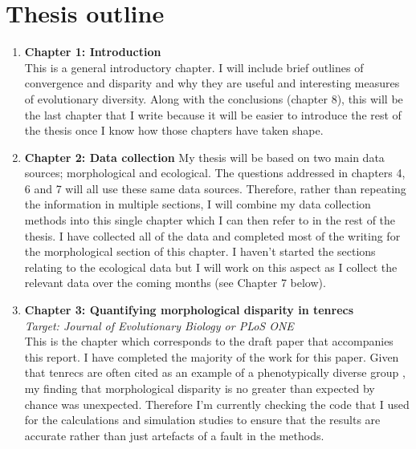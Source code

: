 \documentclass[12pt,a4paper]{article}
\begin{document}
\section{Thesis outline}
\begin{enumerate}
\item \textbf{Chapter 1: Introduction}\\

This is a general introductory chapter. I will include brief outlines of convergence and disparity and why they are useful and interesting measures of evolutionary diversity.
Along with the conclusions (chapter 8), this will be the last chapter that I write because it will be easier to introduce the rest of the thesis once I know how those chapters have taken shape. 

\item \textbf{Chapter 2: Data collection}
My thesis will be based on two main data sources; morphological and ecological. The questions addressed in chapters 4, 6 and 7 will all use these same data sources. Therefore, rather than repeating the information in multiple sections, I will combine my data collection methods into this single chapter which I can then refer to in the rest of the thesis. 
I have collected all of the data and completed most of the writing for the morphological section of this chapter. I haven't started the sections relating to the ecological data but I will work on this aspect as I collect the relevant data over the coming months (see Chapter 7 below).




\item \textbf{Chapter 3: Quantifying morphological disparity in tenrecs}\\
\textit{Target: Journal of Evolutionary Biology or PLoS ONE}\\
This is the chapter which corresponds to the draft paper that accompanies this report. I have completed the majority of the work for this paper. Given that tenrecs are often cited as an example of a phenotypically diverse group \citep[e.g.][]{Olson2013}, my finding that morphological disparity is no greater than expected by chance was unexpected. Therefore I'm currently checking the code that I used for the calculations and simulation studies to ensure that the results are accurate rather than just artefacts of a fault in the methods. 



\end{enumerate}
\end{document}
